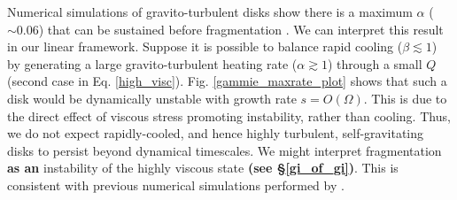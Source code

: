 Numerical simulations of gravito-turbulent disks show there is a
maximum $\alpha$ ($\sim 0.06$) that can be sustained before
fragmentation \citep{rice05}. We can interpret this result in our
linear framework. 
Suppose it is possible to balance rapid cooling ($\beta\lesssim1$) 
by generating a large gravito-turbulent heating rate
($\alpha\gtrsim 1$) through a small $Q$ (second case in
Eq. \ref{high_visc}). Fig. \ref{gammie_maxrate_plot}  
shows that such a disk would be dynamically unstable with 
growth rate $s = O(\Omega)$. This is due to the direct effect of viscous 
stress promoting instability, rather than cooling. Thus, we do not expect rapidly-cooled, 
and hence highly turbulent, self-gravitating disks to persist beyond
dynamical timescales.
We might interpret fragmentation {\bf as an} instability
of the highly viscous state {\bf (see \S\ref{gi_of_gi})}. This is
consistent with previous numerical 
simulations performed by \cite{lodato05}. 

